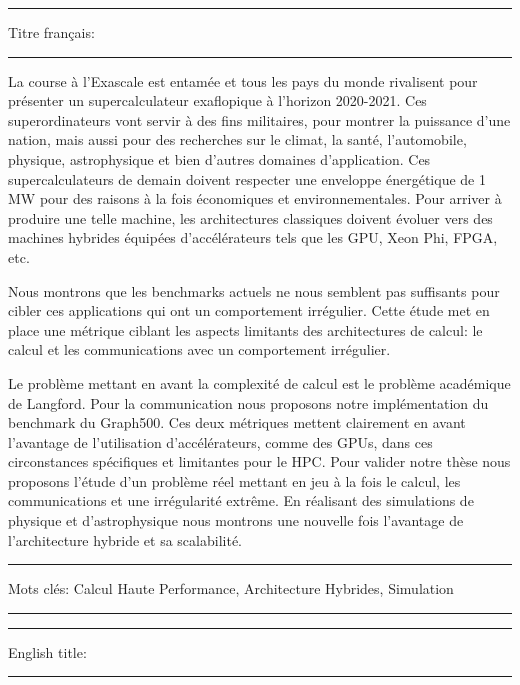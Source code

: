 \hrule
\vspace{.2cm}
Titre français: \textbf{\phdTitleFR}
\vspace{.2cm}
\hrule
\vspace{.5cm}

La course à l'Exascale est entamée et tous les pays du monde rivalisent pour présenter un supercalculateur exaflopique à l'horizon 2020-2021. 
Ces superordinateurs vont servir à des fins militaires, pour montrer la puissance d'une nation, mais aussi pour des recherches sur le climat, la santé, l'automobile, physique, astrophysique et bien d'autres domaines d'application. 
Ces supercalculateurs de demain doivent respecter une enveloppe énergétique de 1 MW pour des raisons à la fois économiques et environnementales. 
Pour arriver à produire une telle machine, les architectures classiques doivent évoluer vers des machines hybrides équipées d'accélérateurs tels que les GPU, Xeon Phi, FPGA, etc. 

Nous montrons que les benchmarks actuels ne nous semblent pas suffisants pour cibler ces applications qui ont un comportement irrégulier. 
Cette étude met en place une métrique ciblant les aspects limitants des architectures de calcul: le calcul et les communications avec un comportement irrégulier. 

Le problème mettant en avant la complexité de calcul est le problème académique de Langford. 
Pour la communication nous proposons notre implémentation du benchmark du Graph500.
Ces deux métriques mettent clairement en avant l'avantage de l'utilisation d'accélérateurs, comme des GPUs, dans ces circonstances spécifiques et limitantes pour le HPC. 
Pour valider notre thèse nous proposons l'étude d'un problème réel mettant en jeu à la fois le calcul, les communications et une irrégularité extrême. 
En réalisant des simulations de physique et d'astrophysique nous montrons une nouvelle fois l'avantage de l'architecture hybride et sa scalabilité. 

\vspace{.5cm}
\hrule
\vspace{.2cm}

{
\small
Mots clés: Calcul Haute Performance, Architecture Hybrides, Simulation
}

\vspace{.1cm}
\hrule

\vspace{1cm}
\hrule
\vspace{.2cm}
English title: \textbf{\phdTitleEN}
\vspace{.2cm}
\hrule
\vspace{.5cm}

